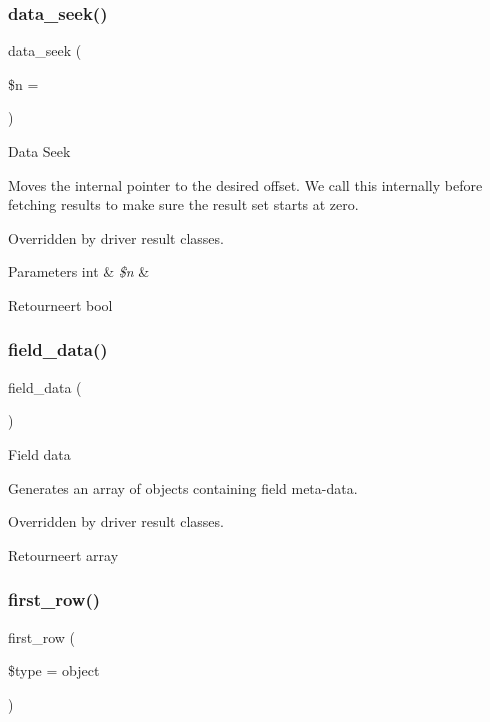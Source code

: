 \subsubsection{\texorpdfstring{data\_seek()}{data\_seek()}}
{\footnotesize\ttfamily data\+\_\+seek (\begin{DoxyParamCaption}\item[{}]{\$n = {} }\end{DoxyParamCaption})}

Data Seek

Moves the internal pointer to the desired offset. We call this internally before fetching results to make sure the result set starts at zero.

Overridden by driver result classes.


\begin{DoxyParams}[1]{Parameters}
int & {\em \$n} & \\
\hline
\end{DoxyParams}
\begin{DoxyReturn}{Retourneert}
bool 
\end{DoxyReturn}
\mbox{\label{class_c_i___d_b__result_a84bffd65e53902ade1591716749a33e3}} 
\subsubsection{\texorpdfstring{field\_data()}{field\_data()}}
{\footnotesize\ttfamily field\+\_\+data (\begin{DoxyParamCaption}{ }\end{DoxyParamCaption})}

Field data

Generates an array of objects containing field meta-\/data.

Overridden by driver result classes.

\begin{DoxyReturn}{Retourneert}
array 
\end{DoxyReturn}
\mbox{\label{class_c_i___d_b__result_a9d7ddad4b02edf86c4f1ec27c0c8a2d7}} 
\subsubsection{\texorpdfstring{first\_row()}{first\_row()}}
{\footnotesize\ttfamily first\+\_\+row (\begin{DoxyParamCaption}\item[{}]{\$type = {\ttfamily \textquotesingle{}object\textquotesingle{}} }\end{DoxyParamCaption})}


